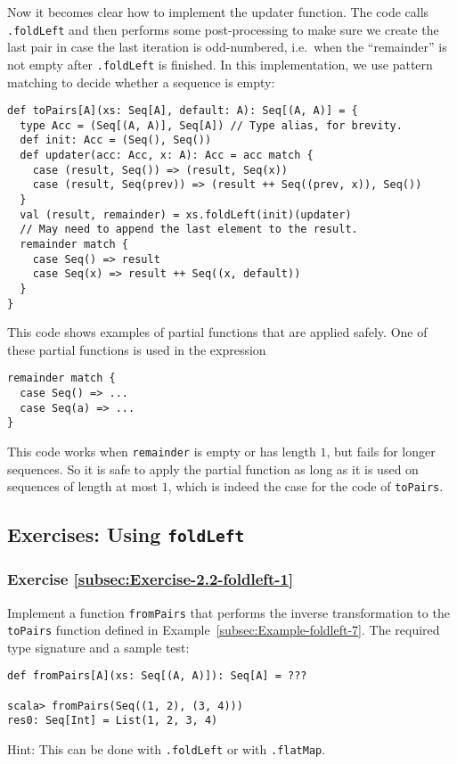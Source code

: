 Now it becomes clear how to implement the updater function. The code
calls \lstinline!.foldLeft!
and then performs some post-processing to make sure we create the
last pair in case the last iteration is odd-numbered, i.e.~when the
``remainder'' is not empty after \lstinline!.foldLeft!
is finished. In this implementation, we use pattern matching to decide
whether a sequence is empty:
\begin{lstlisting}
def toPairs[A](xs: Seq[A], default: A): Seq[(A, A)] = {
  type Acc = (Seq[(A, A)], Seq[A]) // Type alias, for brevity.
  def init: Acc = (Seq(), Seq())
  def updater(acc: Acc, x: A): Acc = acc match {
    case (result, Seq()) => (result, Seq(x))
    case (result, Seq(prev)) => (result ++ Seq((prev, x)), Seq())
  }
  val (result, remainder) = xs.foldLeft(init)(updater)
  // May need to append the last element to the result.
  remainder match {
    case Seq() => result
    case Seq(x) => result ++ Seq((x, default))
  }
}
\end{lstlisting}
This code shows examples of partial functions that are applied safely.
One of these partial functions is used in the expression
\begin{lstlisting}
remainder match {
  case Seq() => ...
  case Seq(a) => ...
}
\end{lstlisting}
This code works when \lstinline!remainder!
is empty or has length $1$, but fails for longer sequences. So it
is safe to apply the partial function as long as it is used on sequences
of length at most $1$, which is indeed the case for the code of \lstinline!toPairs!.

\subsection{Exercises: Using \texttt{foldLeft}}

\subsubsection{Exercise \label{subsec:Exercise-2.2-foldleft-1}\ref{subsec:Exercise-2.2-foldleft-1}}

Implement a function \lstinline!fromPairs!
that performs the inverse transformation to the \lstinline!toPairs!
function defined in Example~\ref{subsec:Example-foldleft-7}. The
required type signature and a sample test:
\begin{lstlisting}
def fromPairs[A](xs: Seq[(A, A)]): Seq[A] = ???

scala> fromPairs(Seq((1, 2), (3, 4)))
res0: Seq[Int] = List(1, 2, 3, 4)
\end{lstlisting}
Hint: This can be done with \lstinline!.foldLeft!
or with \lstinline!.flatMap!.

